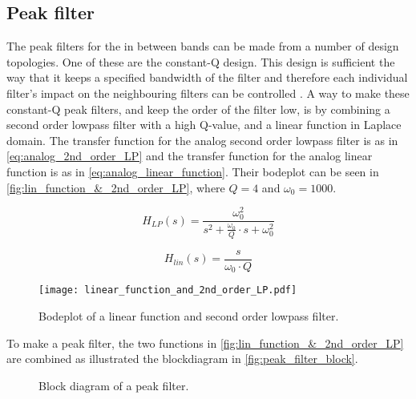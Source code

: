 \subsection{Peak filter}
The peak filters for the in between bands can be made from a number of design topologies. One of these are the constant-Q design. This design is sufficient the way that it keeps a specified bandwidth of the filter and therefore each individual filter's impact on the neighbouring filters can be controlled \citep{constant_Q}.
A way to make these constant-Q peak filters, and keep the order of the filter low, is by combining a second order lowpass filter with a high Q-value, and a linear function in Laplace domain.
The transfer function for the analog second order lowpass filter is as in \autoref{eq:analog_2nd_order_LP} and the transfer function for the analog linear function is as in \autoref{eq:analog_linear_function}. Their bodeplot can be seen in \autoref{fig:lin_function_&_2nd_order_LP}, where $Q = 4$ and $\omega_0 = 1000$. 

\begin{equation}\label{eq:analog_2nd_order_LP}
        H_{LP}(s) = \frac{\omega_0^2}{s^2+\frac{\omega_0}{Q}\cdot s + \omega_0^2}
    \end{equation}

    \startexplain
    \stopexplain

\begin{equation}\label{eq:analog_linear_function}
        H_{lin}(s) = \frac{s}{\omega_0 \cdot Q}
    \end{equation}
    
\begin{figure}
    \centering
        \texttt{[image: linear\_function\_and\_2nd\_order\_LP.pdf]}
        \caption{Bodeplot of a linear function and second order lowpass filter.}
        \label{fig:lin_function_&_2nd_order_LP}
  \end{figure} 

To make a peak filter, the two functions in \autoref{fig:lin_function_&_2nd_order_LP} are combined as illustrated the blockdiagram in \autoref{fig:peak_filter_block}.

\begin{figure}[!h]
\centering
\def\svgwidth{\columnwidth}

\caption{Block diagram of a peak filter.}
		\label{fig:peak_filter_block}
\end{figure}

